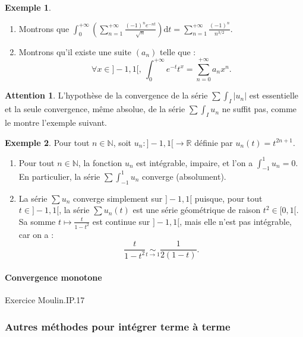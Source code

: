 \documentclass[french]{article}
\newcommand{\N}{\mathbb{N}}
\newcommand{\R}{\mathbb{R}}
\renewcommand{\d}{\text{d}}
\theoremstyle{plain}
\theoremstyle{definition}
\newtheorem*{ex}{Exemple}
\newtheorem*{attention}{Attention}
\theoremstyle{remark}
\begin{document}
\begin{ex}
	\begin{enumerate}
		\item Montrons que $\displaystyle\int_{0}^{+\infty}\left(\sum_{n=1}^{+\infty}\frac{(-1)^ne^{-nt}}{\sqrt{n}}\right)\d t=\sum_{n=1}^{+\infty}\frac{(-1)^n}{n^{3/2}}$.
		\item Montrons qu'il existe une suite $(a_n)$ telle que :
		$$\forall x\in]-1,1[,\ \int_{0}^{+\infty}e^{-t}t^x=\sum_{n=0}^{+\infty}a_n x^n.$$
	\end{enumerate}
\end{ex}

\begin{attention}
	L'hypothèse de la convergence de la série $\displaystyle\sum\int_I\lvert u_n\rvert$ est essentielle et la seule convergence, même absolue, de la série $\displaystyle\sum\int_I u_n$ ne suffit pas, comme le montre l'exemple suivant.
\end{attention}

\begin{ex}
	Pour tout $n\in\N$, soit $u_n:]-1,1[\to\R$ définie par $u_n(t)=t^{2n+1}$.
	\begin{enumerate}
		\item Pour tout $n\in\N$, la fonction $u_n$ est intégrable, impaire, et l'on a $\displaystyle\int_{-1}^{1}u_n=0$.\\
		En particulier, la série $\displaystyle\sum\int_{-1}^{1}u_n$ converge (absolument).
		\item La série $\displaystyle\sum u_n$ converge simplement sur $]-1,1[$ puisque, pour tout $t\in]-1,1[$, la série $\displaystyle\sum u_n(t)$ est une série géométrique de raison $t^2\in[0,1[$. \\
		Sa somme $t\mapsto\displaystyle\frac{t}{1-t^2}$ est continue sur $]-1,1[$, mais elle n'est pas intégrable, car on a :
		$$\frac{t}{1-t^2}\underset{t\to 1}{\sim}\frac{1}{2(1-t)}.$$ 
	\end{enumerate}
\end{ex}

\paragraph{Convergence monotone} Exercice Moulin.IP.17

\subsubsection*{Autres méthodes pour intégrer terme à terme}
\end{document}
